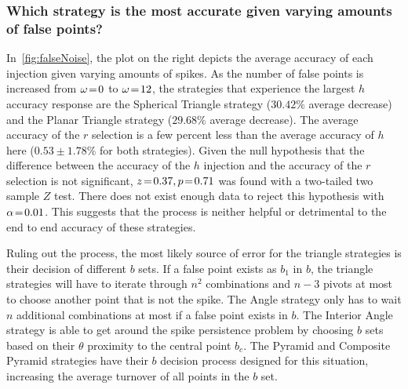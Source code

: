 \subsubsection{Which strategy is the most accurate given varying amounts of false points?}
%
%
%
%
In~\autoref{fig:falseNoise}, the plot on the right depicts the average accuracy of each injection given varying amounts
of spikes.
As the number of false points is increased from $\omega \!=\! 0$ to $\omega \!=\! 12$, the strategies that experience
the largest $h$ accuracy response are the Spherical Triangle strategy ($30.42\%$ average decrease) and the Planar
Triangle strategy ($29.68\%$ average decrease).
The average accuracy of the $r$ selection is a few percent less than the average accuracy of $h$ here
($0.53\!\pm\!1.78\%$ for both strategies).
Given the null hypothesis that the difference between the accuracy of the $h$ injection and the accuracy of the $r$
selection is not significant, $z \!=\! 0.37, p \!=\! 0.71$ was found with a two-tailed two sample $Z$ test.
There does not exist enough data to reject this hypothesis with $\alpha \!=\! 0.01$.
This suggests that the  process is neither helpful or detrimental to the end to end accuracy of these
strategies.

Ruling out the  process, the most likely source of error for the triangle strategies is their decision of
different $b$ sets.
If a false point exists as $b_1$ in $b$, the triangle strategies will have to iterate through $n^2$ combinations and
$n - 3$ pivots at most to choose another point that is not the spike.
The Angle strategy only has to wait $n$ additional combinations at most if a false point exists in $b$.
The Interior Angle strategy is able to get around the spike persistence problem by choosing $b$ sets based on their
$\theta$ proximity to the central point $b_c$.
The Pyramid and Composite Pyramid strategies have their $b$ decision process designed for this situation, increasing the
average turnover of all points in the $b$ set.

